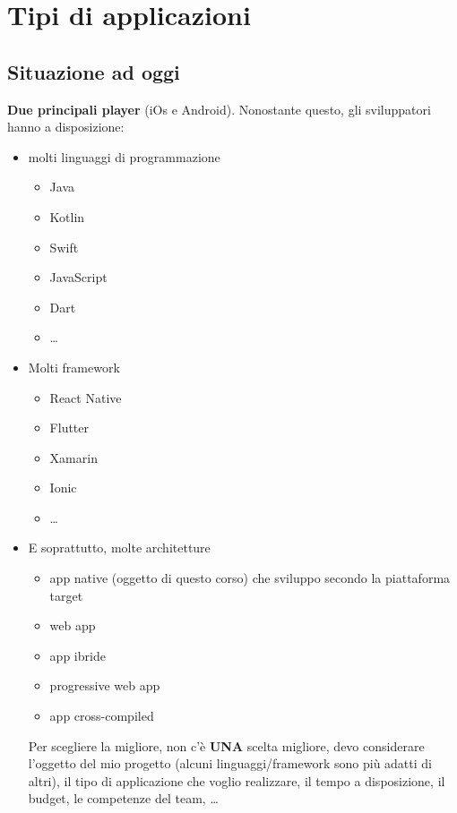 
\chapter{Tipi di applicazioni}
\section{Situazione ad oggi}
\par \textbf{Due principali player} (iOs e Android). Nonostante questo, gli sviluppatori hanno a disposizione:
\begin{itemize}
    \item molti linguaggi di programmazione
    \begin{itemize}
        \item Java
        \item Kotlin
        \item Swift
        \item JavaScript
        \item Dart
        \item \dots
    \end{itemize}
    \item Molti framework
    \begin{itemize}
        \item React Native
        \item Flutter
        \item Xamarin
        \item Ionic
        \item \dots
    \end{itemize}
    \item E soprattutto, molte architetture
    \begin{itemize}
        \item app native (oggetto di questo corso) che sviluppo secondo la piattaforma target
        \item web app
        \item app ibride
        \item progressive web app
        \item app cross-compiled
    \end{itemize}
    Per scegliere la migliore, non c'è \textbf{UNA} scelta migliore, devo considerare l'oggetto del mio progetto (alcuni linguaggi/framework sono più adatti di altri), il tipo di applicazione che voglio realizzare, il tempo a disposizione, il budget, le competenze del team, \dots
\end{itemize}

